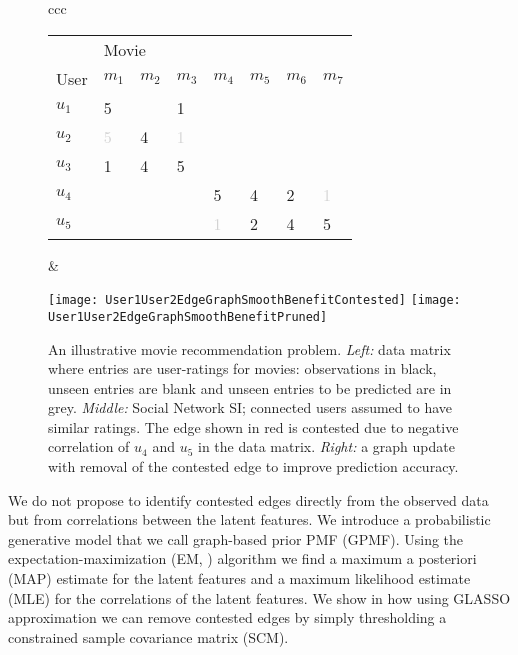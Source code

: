 \documentclass{article}
\theoremstyle{plain}
\theoremstyle{definition}
\theoremstyle{remark}
\begin{document}
\begin{figure}[t]
\begin{tabular}{ccc}
  \begin{minipage}[c]{0.6\textwidth}
  \vspace{0pt}
  \begin{tabular}{llllllll}
    \toprule
    \multicolumn{1}{c}{} & \multicolumn{3}{l}{Movie}                   \\
    \cmidrule(r){2-8}
     User     & $m_1$ & $m_2$ & $ m_3$ & $m_4$ & $m_5$ & $ m_6$ & $ m_7$ \\
    \midrule
     $u_1$ &  5 &   &  1   &&&&\\
     $u_2$     & \textcolor{lightgray}{5} &  4 & \textcolor{lightgray}{1} &&&&\\
     $u_3$  &  1 & 4 & 5  &&&& \\
     $u_4$ &&&&  5 & 4 & 2 &  \textcolor{lightgray}{1}   \\
    $u_5$ &&&& \textcolor{lightgray}{1} &  2 & 4 & 5 \\
    \bottomrule
  \end{tabular}
  \end{minipage}
  & 
  \begin{minipage}{0.35\textwidth}
  \flushleft
  {\vspace{0.01cm}\texttt{[image: User1User2EdgeGraphSmoothBenefitContested]}}
\flushright
   {\vspace{0.01cm}\texttt{[image: User1User2EdgeGraphSmoothBenefitPruned]}}
\end{minipage}
\end{tabular}
\caption{An illustrative movie recommendation problem.
\emph{Left:} data matrix where entries are user-ratings for movies: observations in black, unseen entries are blank and unseen entries to be predicted are in grey.
\emph{Middle:} Social Network SI; connected users assumed to have similar ratings. The edge shown in red is contested due to negative correlation of $u_4$ and $u_5$ in the data matrix. \emph{Right:} a graph update with removal of the contested edge to improve prediction accuracy.
}
\label{fig:CombinedIllustration}
\end{figure}



We do not propose to identify contested edges directly from the observed data but from correlations between the latent features. We introduce a probabilistic generative model that we call graph-based prior PMF (GPMF). Using the expectation-maximization (EM, \cite{bishop2006PRML}) algorithm we find a maximum a posteriori (MAP) estimate for the latent features and a maximum likelihood estimate (MLE) for the correlations of the latent features. We show in  how using GLASSO approximation we can remove contested edges by simply thresholding a constrained sample covariance matrix (SCM).
\end{document}
